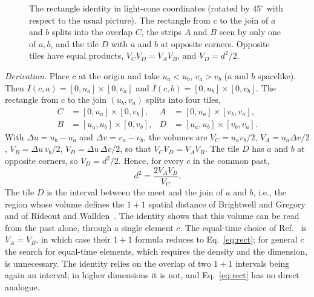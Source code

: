 \documentclass[prd,twocolumn,superscriptaddress,nofootinbib,amsmath,amssymb,floatfix]{revtex4-2}
\begin{document}
\begin{figure}[t]
\centering
{}
\caption{The rectangle identity in light-cone coordinates (rotated by $45^\circ$ with respect to the usual picture). The rectangle from $c$ to the join of $a$ and $b$ splits into the overlap $C$, the strips $A$ and $B$ seen by only one of $a,b$, and the tile $D$ with $a$ and $b$ at opposite corners. Opposite tiles have equal products, $V_CV_D=V_AV_B$, and $V_D=d^2/2$.}
\label{fig:tiles}
\end{figure}

\emph{Derivation.} Place $c$ at the origin and take $u_a<u_b$, $v_a>v_b$ ($a$ and $b$ spacelike). Then $I(c,a)=[0,u_a]\times[0,v_a]$ and $I(c,b)=[0,u_b]\times[0,v_b]$. The rectangle from $c$ to the join $(u_b,v_a)$ splits into four tiles,
\begin{equation}
\begin{aligned}
C&=[0,u_a]\times[0,v_b], & A&=[0,u_a]\times[v_b,v_a],\\
B&=[u_a,u_b]\times[0,v_b], & D&=[u_a,u_b]\times[v_b,v_a].
\end{aligned}
\end{equation}
With $\Delta u=u_b-u_a$ and $\Delta v=v_a-v_b$, the volumes are $V_C=u_av_b/2$, $V_A=u_a\Delta v/2$, $V_B=\Delta u\,v_b/2$, $V_D=\Delta u\,\Delta v/2$, so that $V_CV_D=V_AV_B$. The tile $D$ has $a$ and $b$ at opposite corners, so $V_D=d^2/2$. Hence, for every $c$ in the common past,
\begin{equation}
d^2=\frac{2V_AV_B}{V_C}.
\label{eq:rect}
\end{equation}
The tile $D$ is the interval between the meet and the join of $a$ and $b$, i.e., the region whose volume defines the $1+1$ spatial distance of Brightwell and Gregory and of Rideout and Wallden~\cite{BrightwellGregory91,RideoutWallden09}. The identity shows that this volume can be read from the past alone, through a single element $c$. The equal-time choice of Ref.~\cite{BK24} is $V_A=V_B$, in which case their $1+1$ formula reduces to Eq.~\eqref{eq:rect}; for general $c$ the search for equal-time elements, which requires the density and the dimension, is unnecessary. The identity relies on the overlap of two $1+1$ intervals being again an interval; in higher dimensions it is not, and Eq.~\eqref{eq:rect} has no direct analogue.
\end{document}
